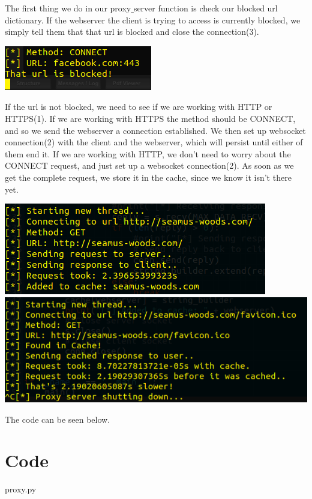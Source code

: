 \documentclass[12pt]{report}
\begin{document}
The first thing we do in our proxy$\_$server function is check our blocked url dictionary. If the webserver the client is trying to access is currently blocked, we simply tell them that that url is blocked and close the connection(3). 
\begin{center}
\includegraphics[scale=0.5]{blocked.png}
\end{center}
If the url is not blocked, we need to see if we are working with HTTP or HTTPS(1). If we are working with HTTPS the method should be CONNECT, and so we send the webserver a connection established. We then set up websocket connection(2) with the client and the webserver, which will persist until either of them end it. If we are working with HTTP, we don't need to worry about the CONNECT request, and just set up a websocket connection(2). As soon as we get the complete request, we store it in the cache, since we know it isn't there yet.  
\begin{center}
\includegraphics[scale=0.3]{beforecache.png}
\includegraphics[scale=0.3]{aftercache.png}
\end{center}
The code can be seen below.


\section{Code}
\lstset{%
  language=Python,
  basicstyle=\footnotesize,
  showstringspaces=false,
  numbers=left,
  breakatwhitespace=false,
  breaklines=true,
  breakatwhitespace=true,
}

{proxy.py}
\end{document}
